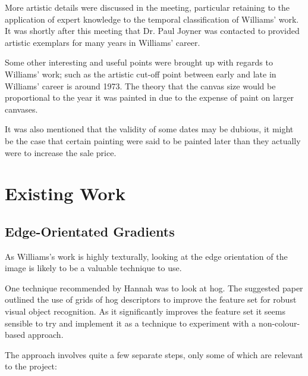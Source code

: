 More artistic details were discussed in the meeting, particular retaining to the application of
expert knowledge to the temporal classification of Williams' work. It was shortly after this 
meeting that Dr. Paul Joyner was contacted to provided artistic exemplars for many years in 
Williams' career.

Some other interesting and useful points were brought up with regards to Williams' work; such as the artistic cut-off 
point between early and late in Williams' career is around 1973. The theory that the canvas size
would be proportional to the year it was painted in due to the expense of paint on larger 
canvases.

It was also mentioned that the validity of some dates may be dubious, it might be the case that 
certain painting were said to be painted later than they actually were to increase the sale price.


\section{Existing Work}

\subsection{Edge-Orientated Gradients}\label{sec:existing-hogs}
As Williams's work is highly texturally, looking at the edge orientation of the image is
likely to be a valuable technique to use.

One technique recommended by Hannah was to look at \gls{hog}. The suggested paper outlined the use
of grids of \gls{hog} descriptors to improve the feature set for robust visual object
recognition\cite{Dalal2005Histograms}. As it significantly improves the feature set it seems
sensible to try and implement it as a technique to experiment with a non-colour-based approach.

The approach involves quite a few separate steps, only some of which are relevant to the project:


